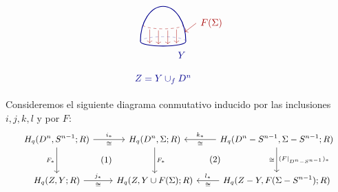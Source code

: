 \begin{dem}
\[\begin{tikzpicture}[baseline=(current bounding box.center), scale=0.95]
\begin{scope}[xshift=4.95cm]
        \draw[dashed, blue!55!black!45]
            (0.88, -0.25) arc[start angle=0, end angle=180, x radius=0.88, y radius=0.18];
        \draw[dashed, red!65!black!80]
            (-0.777, 0.384) arc[start angle=180, end angle=360, x radius=0.777, y radius=0.15];

        \draw[thick, blue!55!black]
            (0.88, -0.25) arc[start angle=0, end angle=180, x radius=0.88, y radius=1.35];
        \draw[thick, blue!55!black]
            (-0.88, -0.25) arc[start angle=180, end angle=360, x radius=0.88, y radius=0.18];

        \draw[->, thin, red!65!black!85] (-0.52, 0.21) -- (-0.52, -0.32);
        \draw[->, thin, red!65!black!85] (-0.18, 0.17) -- (-0.18, -0.36);
        \draw[->, thin, red!65!black!85] ( 0.18, 0.17) -- ( 0.18, -0.36);
        \draw[->, thin, red!65!black!85] ( 0.52, 0.21) -- ( 0.52, -0.32);

        \draw[->, thin, red!65!black] (1.28, 0.45) -- (0.85, 0.12);
        \node[red!65!black, right=1pt] at (1.28, 0.45) {$F(\Sigma)$};
        \node[blue!55!black] at (0.72, -0.78) {$Y$};
        \node[blue!55!black] at (0, -1.72) {$Z = Y \cup_f D^n$};
    \end{scope}
\end{tikzpicture}
\]

Consideremos el siguiente diagrama conmutativo inducido por las inclusiones $i, j, k, l$ y por $F$:
\[
{\small
\begin{tikzcd}[column sep=2.2em, row sep=2.8em]
H_q(D^n, S^{n-1}; R)
    \arrow[r, "i_*", "\cong"']
    \arrow[d, "F_*"']
    \arrow[dr, phantom, "\text{(1)}"]
& H_q(D^n, \Sigma; R)
    \arrow[d, "F_*"]
    \arrow[dr, phantom, "\text{(2)}"]
& H_q(D^n - S^{n-1}, \Sigma - S^{n-1}; R)
    \arrow[l, "k_*"', "\cong"]
    \arrow[d, "(F|_{D^n - S^{n-1}})_*", "\cong"'] \\
H_q(Z, Y; R)
    \arrow[r, "j_*", "\cong"']
& H_q(Z, Y \cup F(\Sigma); R)
& H_q(Z - Y, F(\Sigma - S^{n-1}); R)
    \arrow[l, "l_*"', "\cong"]
\end{tikzcd}}
\]


\end{dem}
